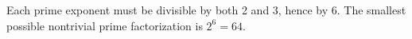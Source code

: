 Each prime exponent must be divisible by both 2 and 3, hence by 6. The smallest possible nontrivial prime factorization is $ 2^6=\boxed{64}$.
